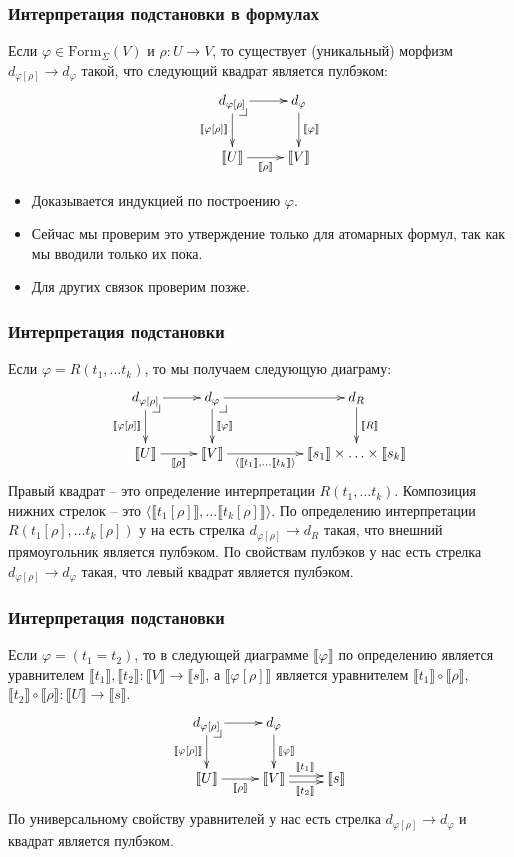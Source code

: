 \documentclass{beamer}
\makeatletter
\theoremstyle{definition}
\renewcommand{\ll}{\llbracket}
\newcommand{\rr}{\rrbracket}
\newcommand{\fs}[1]{\mathrm{#1}}
\newcommand{\pb}[1][dr]{\save*!/#1-1.2pc/#1:(-1,1)@^{|-}\restore}
\makeatother
\begin{document}
\begin{frame}
\frametitle{Интерпретация подстановки в формулах}
\begin{lem}
Если $\varphi \in \fs{Form}_\Sigma(V)$ и $\rho : U \to V$, то существует (уникальный) морфизм $d_{\varphi[\rho]} \to d_\varphi$ такой, что следующий квадрат является пулбэком:
\[ \xymatrix{ d_{\varphi[\rho]} \ar[r] \ar[d]_{\ll \varphi[\rho] \rr} \pb & d_\varphi \ar[d]^{\ll \varphi \rr} \\
              \ll U \rr \ar[r]_-{\ll \rho \rr}        & \ll V \rr
            } \]
\end{lem}
\begin{itemize}
\item Доказывается индукцией по построению $\varphi$.
\item Сейчас мы проверим это утверждение только для атомарных формул, так как мы вводили только их пока.
\item Для других связок проверим позже.
\end{itemize}
\end{frame}

\begin{frame}
\frametitle{Интерпретация подстановки}
Если $\varphi = R(t_1, \ldots t_k)$, то мы получаем следующую диаграму:
\[ \xymatrix{ d_{\varphi[\rho]} \ar[r] \ar[d]_{\ll \varphi[\rho] \rr} \pb & d_\varphi \ar[d]^{\ll \varphi \rr} \ar[rr] \pb                                        & & d_R \ar[d]^{\ll R \rr} \\
              \ll U \rr \ar[r]_-{\ll \rho \rr}            & \ll V \rr \ar[rr]_-{\langle \ll t_1 \rr, \ldots \ll t_k \rr \rangle} & & \ll s_1 \rr \times \ldots \times \ll s_k \rr
            } \]
Правый квадрат -- это определение интерпретации $R(t_1, \ldots t_k)$.
Композиция нижних стрелок -- это $\langle \ll t_1[\rho] \rr, \ldots \ll t_k[\rho] \rr \rangle$.
По определению интерпретации $R(t_1[\rho], \ldots t_k[\rho])$ у на есть стрелка $d_{\varphi[\rho]} \to d_R$ такая, что внешний прямоугольник является пулбэком.
По свойствам пулбэков у нас есть стрелка $d_{\varphi[\rho]} \to d_\varphi$ такая, что левый квадрат является пулбэком.
\end{frame}

\begin{frame}
\frametitle{Интерпретация подстановки}
Если $\varphi = (t_1 = t_2)$, то в следующей диаграмме $\ll \varphi \rr$ по определению является уравнителем $\ll t_1 \rr, \ll t_2 \rr : \ll V \rr \to \ll s \rr$, а $\ll \varphi[\rho] \rr$ является уравнителем $\ll t_1 \rr \circ \ll \rho \rr$, $\ll t_2 \rr \circ \ll \rho \rr : \ll U \rr \to \ll s \rr$.
\[ \xymatrix{ d_{\varphi[\rho]} \ar[r] \ar[d]_{\ll \varphi[\rho] \rr} \pb & d_\varphi \ar[d]^{\ll \varphi \rr} \\
              \ll U \rr \ar[r]_-{\ll \rho \rr}        & \ll V \rr \ar@<-.5ex>[r]_{\ll t_2 \rr} \ar@<.5ex>[r]^{\ll t_1 \rr} & \ll s \rr
            } \]
По универсальному свойству уравнителей у нас есть стрелка $d_{\varphi[\rho]} \to d_\varphi$ и квадрат является пулбэком.
\end{frame}
\end{document}

